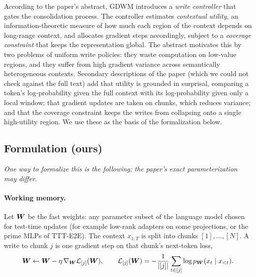 According to the paper's abstract, GDWM introduces a \emph{write controller} that gates the
consolidation process. The controller estimates \emph{contextual utility}, an
information-theoretic measure of how much each region of the context depends on long-range
context, and allocates gradient steps accordingly, subject to a \emph{coverage constraint} that
keeps the representation global. The abstract motivates this by two problems of uniform write
policies: they waste computation on low-value regions, and they suffer from high gradient
variance across semantically heterogeneous contexts. Secondary descriptions of the paper (which
we could not check against the full text) add that utility is grounded in surprisal, comparing
a token's log-probability given the full context with its log-probability given only a local
window; that gradient updates are taken on chunks, which reduces variance; and that the coverage
constraint keeps the writes from collapsing onto a single high-utility region. We use these as
the basis of the formalization below.

\subsection{Formulation (ours)}

\emph{One way to formalize this is the following; the paper's exact parameterization may
differ.}

\paragraph{Working memory.} Let $\bm{W}$ be the fast weights: any parameter subset of the language
model chosen for test-time updates (for example low-rank adapters on some projections, or the
prime MLPs of TTT-E2E). The context $x_{1:T}$ is split into chunks $[1],\dots,[N]$. A write to
chunk $j$ is one gradient step on that chunk's next-token loss,
\begin{equation}
  \bm{W} \gets \bm{W} - \eta\,\nabla_{\bm{W}}\mathcal{L}_{[j]}(\bm{W}), \qquad
  \mathcal{L}_{[j]}(\bm{W}) = -\frac{1}{\left\lvert [j]\right\rvert}\sum_{t\in[j]}\log p_{\bm{W}}(x_t \mid x_{<t}).
\end{equation}

